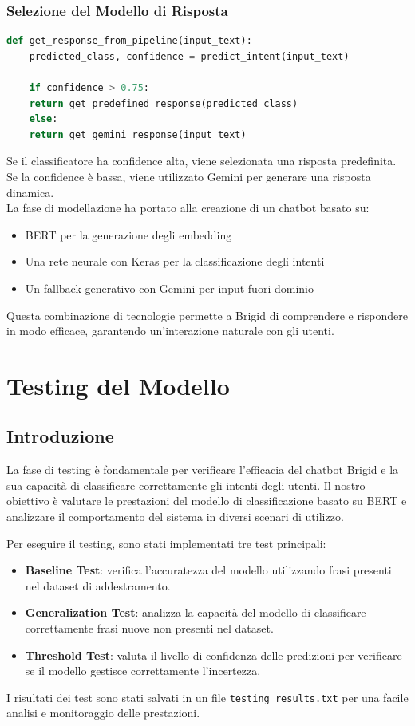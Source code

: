 \documentclass[12pt, letterpaper]{article}
\begin{document}
\subsubsection{Selezione del Modello di Risposta}
\begin{lstlisting}[language=Python]
	def get_response_from_pipeline(input_text):
	predicted_class, confidence = predict_intent(input_text)
	
	if confidence > 0.75:
	return get_predefined_response(predicted_class)
	else:
	return get_gemini_response(input_text)
\end{lstlisting}
Se il classificatore ha confidence alta, viene selezionata una risposta predefinita. Se la confidence è bassa, viene utilizzato Gemini per generare una risposta dinamica.\\
\newpage
La fase di modellazione ha portato alla creazione di un chatbot basato su:
\begin{itemize}
	\item BERT per la generazione degli embedding
	\item Una rete neurale con Keras per la classificazione degli intenti
	\item Un fallback generativo con Gemini per input fuori dominio
\end{itemize}
Questa combinazione di tecnologie permette a Brigid di comprendere e rispondere in modo efficace, garantendo un'interazione naturale con gli utenti.

\section{Testing del Modello}

\subsection{Introduzione}
La fase di testing è fondamentale per verificare l'efficacia del chatbot Brigid e la sua capacità di classificare correttamente gli intenti degli utenti. Il nostro obiettivo è valutare le prestazioni del modello di classificazione basato su BERT e analizzare il comportamento del sistema in diversi scenari di utilizzo.

Per eseguire il testing, sono stati implementati tre test principali:
\begin{itemize}
	\item \textbf{Baseline Test}: verifica l'accuratezza del modello utilizzando frasi presenti nel dataset di addestramento.
	\item \textbf{Generalization Test}: analizza la capacità del modello di classificare correttamente frasi nuove non presenti nel dataset.
	\item \textbf{Threshold Test}: valuta il livello di confidenza delle predizioni per verificare se il modello gestisce correttamente l'incertezza.
\end{itemize}
I risultati dei test sono stati salvati in un file \texttt{testing\_results.txt} per una facile analisi e monitoraggio delle prestazioni.
\end{document}

